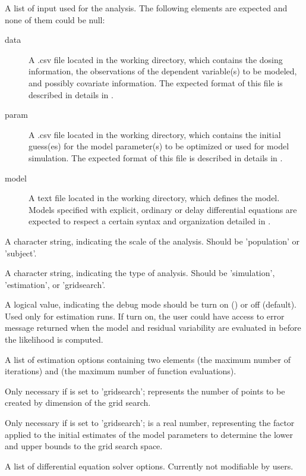 \begin{Arguments}
\begin{ldescription}
\item[\code{files}] A list of input used for the analysis. The following elements are
expected and none of them could be null: \begin{description}

\item[data] A .csv file located in the working directory, which contains
the dosing information, the observations of the dependent variable(s)
to be modeled, and possibly covariate information. The expected format 
of this file is described in details in .
\item[param] A .csv file located in the working directory, which contains
the initial guess(es) for the model parameter(s) to be optimized or used
for model simulation. The expected format of this file is described in
details in .
\item[model] A text file located in the working directory, which defines 
the model. Models specified with explicit, ordinary or delay 
differential equations are expected to respect a certain syntax and 
organization detailed in .


\end{description}


\item[\code{method}] A character string, indicating the scale of the analysis. Should
be 'population' or 'subject'.
\item[\code{runtype}] A character string, indicating the type of analysis. Should be
'simulation', 'estimation', or 'gridsearch'.
\item[\code{debugmode}] A logical value, indicating the debug mode should be turn on
() or off (default). Used only for estimation runs. If turn on,
the user could have access to error message returned when the model and
residual variability are evaluated in  before the likelihood
is computed.
\item[\code{estim.options}] A list of estimation options containing two elements
 (the maximum number of iterations) and  (the
maximum number of function evaluations).
\item[\code{npts}] Only necessary if  is set to 'gridsearch';  
represents the number of points to be created by dimension of the grid 
search.
\item[\code{alpha}] Only necessary if  is set to 'gridsearch'; 
 is a real number, representing the factor applied to the 
initial estimates of the model parameters to determine the lower and upper 
bounds to the grid search space.
\item[\code{solver.options}] A list of differential equation solver options. 
Currently not modifiable by users.
\end{ldescription}
\end{Arguments}
